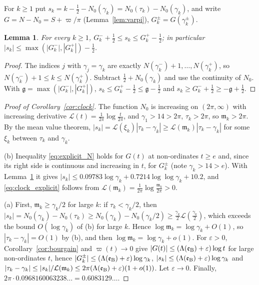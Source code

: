 \documentclass[11pt,a4paper]{article}
\makeatletter
\numberwithin{equation}{section}
\DeclareRobustCommand{\CGref}[1]{\ref{#1}}
\DeclareRobustCommand{\CGeqref}[1]{\eqref{#1}}
\let\CG@origref\ref
\let\CG@origeqref\eqref
\newcommand{\CG@gettip}[1]{\@ifundefined{CGTip@#1}{#1}{\csname CGTip@#1\endcsname}}
\DeclareRobustCommand{\CGref}[1]{\pdftooltip{\CG@origref{#1}}{\CG@gettip{#1}}}
\DeclareRobustCommand{\CGeqref}[1]{\pdftooltip{\CG@origeqref{#1}}{\CG@gettip{#1}}}
\newtheorem{lemma}[theorem]{Lemma}
\theoremstyle{definition}
\theoremstyle{remark}
\newcommand{\Nz}{N_0} %
\newcommand{\lL}{\mathcal L}
\newcommand{\eB}{\mathfrak e_{\rm B}}
\makeatother
\begin{document}
For $k\ge1$ put $s_k=k-\frac12-\Nz(\gamma_k)=\Nz(\tau_k)-\Nz(\gamma_k)$, and write $G=N-\Nz=S+\varpi/\pi$ (Lemma~\CGref{lem:varpi}), $G_k^\pm=G(\gamma_k^\pm)$.

\begin{lemma}\label{lem:s_bounds}
For every $k\ge1$, $G_k^-+\frac12\le s_k\le G_k^+-\frac12$; in particular $|s_k|\le\max(|G_k^-|,|G_k^+|)-\frac12$.
\end{lemma}

\begin{proof}
The indices $j$ with $\gamma_j=\gamma_k$ are exactly $N(\gamma_k^-)+1,\dots,N(\gamma_k^+)$, so $N(\gamma_k^-)+1\le k\le N(\gamma_k^+)$. Subtract $\frac12+\Nz(\gamma_k)$ and use the continuity of $\Nz$. With $\mathfrak g=\max(|G_k^-|,|G_k^+|)$, $s_k\le G_k^+-\frac12\le\mathfrak g-\frac12$ and $s_k\ge G_k^-+\frac12\ge-\mathfrak g+\frac12$.
\end{proof}

\begin{proof}[Proof of Corollary~\ref{cor:clock}]
The function $\Nz$ is increasing on $(2\pi,\infty)$ with increasing derivative $\lL(t)=\frac1{2\pi}\log\frac t{2\pi}$, and $\gamma_1>14>2\pi$, $\tau_k>2\pi$, so $\mathfrak m_k>2\pi$. By the mean value theorem, $|s_k|=\lL(\xi_k)|\tau_k-\gamma_k|\ge\lL(\mathfrak m_k)|\tau_k-\gamma_k|$ for some $\xi_k$ between $\tau_k$ and $\gamma_k$.

(b) Inequality \CGeqref{eq:explicit_N} holds for $G(t)$ at non-ordinates $t\ge e$ and, since its right side is continuous and increasing in $t$, for $G_k^\pm$ (note $\gamma_k>14>e$). With Lemma~\CGref{lem:s_bounds} it gives $|s_k|\le0.09783\log\gamma_k+0.7214\log\log\gamma_k+10.2$, and \CGeqref{eq:clock_explicit} follows from $\lL(\mathfrak m_k)=\frac1{2\pi}\log\frac{\mathfrak m_k}{2\pi}>0$.

(a) First, $\mathfrak m_k\ge\gamma_k/2$ for large $k$: if $\tau_k<\gamma_k/2$, then $|s_k|=\Nz(\gamma_k)-\Nz(\tau_k)\ge\Nz(\gamma_k)-\Nz(\gamma_k/2)\ge\frac{\gamma_k}2\lL(\frac{\gamma_k}2)$, which exceeds the bound $O(\log\gamma_k)$ of (b) for large $k$. Hence $\log\mathfrak m_k=\log\gamma_k+O(1)$, so $|\tau_k-\gamma_k|=O(1)$ by (b), and then $\log\mathfrak m_k=\log\gamma_k+o(1)$. For $\varepsilon>0$, Corollary~\CGref{cor:bourgain} and $\varpi(t)\to0$ give $|G(t)|\le(\Lambda(\eB)+\varepsilon)\log t$ for large non-ordinates $t$, hence $|G_k^\pm|\le(\Lambda(\eB)+\varepsilon)\log\gamma_k$, $|s_k|\le(\Lambda(\eB)+\varepsilon)\log\gamma_k$ and $|\tau_k-\gamma_k|\le|s_k|/\lL(\mathfrak m_k)\le2\pi(\Lambda(\eB)+\varepsilon)(1+o(1))$. Let $\varepsilon\to0$. Finally, $2\pi\cdot0.0968160063238\ldots=0.6083129\ldots$.
\end{proof}
\end{document}
